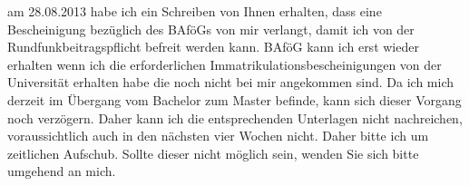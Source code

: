 \documentclass[12pt, ngerman]{g-brief}
\begin{document}
 

\begin{g-brief} 

am 28.08.2013 habe ich ein Schreiben von Ihnen erhalten, dass eine Bescheinigung bezüglich des BAföGs von mir verlangt, damit ich von der Rundfunkbeitragspflicht befreit werden kann. BAföG kann ich erst wieder erhalten wenn ich die erforderlichen Immatrikulationsbescheinigungen von der Universität erhalten habe die noch nicht bei mir angekommen sind. Da ich mich derzeit im Übergang vom Bachelor zum Master befinde, kann sich dieser Vorgang noch verzögern. Daher kann ich die entsprechenden Unterlagen nicht nachreichen, voraussichtlich auch in den nächsten vier Wochen nicht. Daher bitte ich um zeitlichen Aufschub. Sollte dieser nicht möglich sein, wenden Sie sich bitte umgehend an mich.

\end{g-brief}
\end{document}
